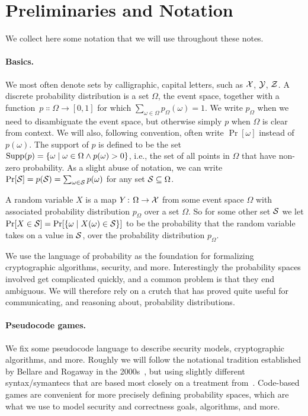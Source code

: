 \section{Preliminaries and Notation}
\label{sec:notation}

We collect here some notation that we will use throughout these notes. 


\paragraph{Basics.}
We most often denote sets by calligraphic, capital letters, such as ${\cal X}$,
${\cal Y}$, $\mathcal{Z}$. A discrete probability distribution is a set $\Omega$, the
event space, together with a
function~$p\Colon\Omega\rightarrow[0,1]$ for which $\sum_{\omega\in\Omega}
p_\Omega(\omega) = 1$.
We write $p_\Omega$ when we need to disambiguate the event space, but
otherwise simply $p$ when $\Omega$ is clear from context. We will also,
following convention, often write $\Pr[\omega]$ instead of $p(\omega)$.
The support of $p$ is defined to be the set $\textnormal{Supp}(p) = \{\omega \;|\; \omega
\in \Omega \land p(\omega) > 0\}$, 
i.e., the set of all points in $\Omega$ that have non-zero probability.  
As a slight abuse of notation, we can write 
$\Pr[{\cal S}] = p({\cal S}) = \sum_{\omega\in{\cal S}} p(\omega)$ for any set ${\cal S} \subseteq \Omega$. 

A random variable $X$ is a map $Y{{\kern .05em}\colon{\kern .05em}}\Omega\rightarrow{\cal X}$ from some event
space $\Omega$ with associated probability distribution $p_\Omega$ over a  set
$\Omega$. So for some other set ${\cal S}$ we let $\Pr[X\in{\cal S}] = \Pr[\{\omega
\;|\; X(\omega) \in {\cal S}\}]$ to be the probability that the random variable
takes on a value in ${\cal S}$, over the probability distribution $p_\Omega$.

We use the language of probability as the foundation for formalizing
cryptographic algorithms, security, and more. Interestingly the probability
spaces involved get complicated quickly, and a common problem is that they end 
ambiguous. We will therefore rely on a crutch that has proved quite useful for
communicating, and reasoning about, probability distributions.


\paragraph{Pseudocode games.} We fix some pseudocode language to describe
security models, cryptographic algorithms, and more. Roughly we will follow the
notational tradition established by Bellare and Rogaway in the
2000s~\cite{bellare2006security}, but using slightly different syntax/symantecs that are
based most closely on a treatment from~\cite{ristenpart2011careful}.  Code-based
games are convenient for more precisely defining probability spaces, which are
what we use to model security and correctness goals, algorithms, and more.  

